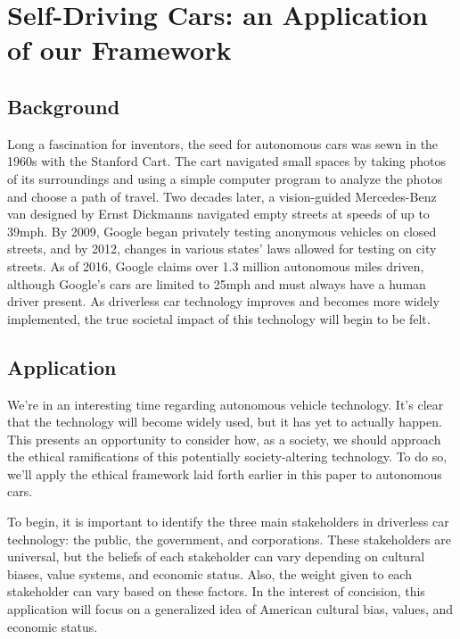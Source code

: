 \section{Self-Driving Cars: an Application of our Framework}
\label{sec:-application}

\subsection{Background}
Long a fascination for inventors, the seed for autonomous cars was sewn 
in the 1960s with the Stanford Cart\cite{moravec1990stanford}. The cart 
navigated small spaces by taking photos of its surroundings and using a 
simple computer program to analyze the photos and choose a path of 
travel. Two decades later, a vision-guided Mercedes-Benz van designed 
by Ernst Dickmanns navigated empty streets at speeds of up to 39mph. By 
2009, Google began privately testing anonymous vehicles on closed 
streets, and by 2012, changes in various states' laws allowed for 
testing on city streets. As of 2016, Google claims over 1.3 million 
autonomous miles driven, although Google's cars are limited 
to 25mph and must always have a human driver present.\cite{wired}  As 
driverless car technology improves and becomes more widely implemented, 
the true societal impact of this technology will begin to be felt.

\subsection{Application}

We're in an interesting time regarding autonomous vehicle technology. 
It's clear that the technology will become widely used, but it has yet 
to actually happen. This presents an opportunity to consider how, as a 
society, we should approach the ethical ramifications of this
potentially society-altering technology. To do so, we'll apply the 
ethical framework laid forth earlier in this paper to autonomous cars.

To begin, it is important to identify the three main stakeholders in 
driverless car technology: the public, the government, and corporations. 
These stakeholders are universal, but the beliefs of each stakeholder can
vary depending on cultural biases, value systems, and economic status. Also,
the weight given to each stakeholder can vary based on these factors. In the 
interest of concision, this application will focus on a generalized idea of American 
cultural bias, values, and economic status.


